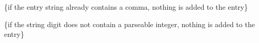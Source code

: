 
\begin{DoxyRefList}
\item[Member \mbox{\hyperlink{class_molk_free_calc_1_1_c_stack_acf75e3c62ac91b05caff5bc2ba867ad4}{Molk\+Free\+Calc.CStack.Entry\+Add\+Comma}} ()]\label{bug__bug000002}%
%
\{if the entry string already contains a comma, nothing is added to the entry\}  
\item[Member \mbox{\hyperlink{class_molk_free_calc_1_1_c_stack_a5a627c9851f7156c05b7b1139b06bbaf}{Molk\+Free\+Calc.CStack.Entry\+Add\+Num}} (string digit)]\label{bug__bug000001}%
%
\{if the string digit does not contain a parseable integer, nothing is added to the entry\} 
\end{DoxyRefList}